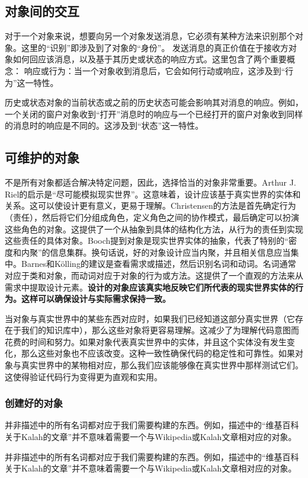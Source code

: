 \subsection{对象间的交互}
对于一个对象来说，想要向另一个对象发送消息，它必须有某种方法来识别那个对象。这里的“识别”即涉及到了对象的“身份”。
发送消息的真正价值在于接收方对象如何回应该消息，以及基于其历史或状态的响应方式。这里包含了两个重要概念：
响应或行为：当一个对象收到消息后，它会如何行动或响应，这涉及到“行为”这一特性。

历史或状态对象的当前状态或之前的历史状态可能会影响其对消息的响应。例如，一个关闭的窗户对象收到“打开”消息时的响应与一个已经打开的窗户对象收到同样的消息时的响应是不同的。这涉及到“状态”这一特性。

\subsection{可维护的对象}
不是所有对象都适合解决特定问题，因此，选择恰当的对象非常重要。Arthur J. Riel的启示是“尽可能模拟现实世界”。这意味着，设计应该基于真实世界的实体和关系。这可以使设计更有意义，更易于理解。Christensen的方法是首先确定行为（责任），然后将它们分组成角色，定义角色之间的协作模式，最后确定可以扮演这些角色的对象。这提供了一个从抽象到具体的结构化方法，从行为的责任到实现这些责任的具体对象。Booch提到对象是现实世界实体的抽象，代表了特别的“密度和内聚”的信息集群。换句话说，好的对象设计应当内聚，并且相关信息应当集中。Barnes和Kölling的建议是查看需求或描述，然后识别名词和动词。名词通常对应于类和对象，而动词对应于对象的行为或方法。这提供了一个直观的方法来从需求中提取设计元素。\textbf{设计的对象应该真实地反映它们所代表的现实世界实体的行为。这样可以确保设计与实际需求保持一致。}

当对象与真实世界中的某些东西对应时，如果我们已经知道这部分真实世界（它存在于我们的知识库中），那么这些对象将更容易理解。这减少了为理解代码意图而花费的时间和努力。如果对象代表真实世界中的实体，并且这个实体没有发生变化，那么这些对象也不应该改变。这种一致性确保代码的稳定性和可靠性。如果对象与真实世界中的某物相对应，那么我们应该能够像在真实世界中那样测试它们。这使得验证代码行为变得更为直观和实用。

\subsubsection{创建好的对象}
并非描述中的所有名词都对应于我们需要构建的东西。例如，描述中的“维基百科关于Kalah的文章”并不意味着需要一个与Wikipedia或Kalah文章相对应的对象。

并非描述中的所有名词都对应于我们需要构建的东西。例如，描述中的“维基百科关于Kalah的文章”并不意味着需要一个与Wikipedia或Kalah文章相对应的对象。


